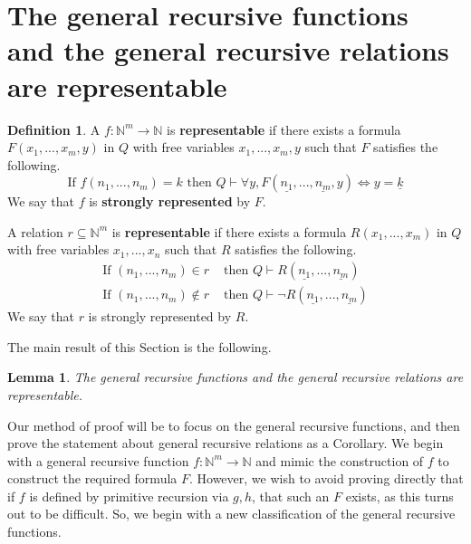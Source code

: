 \documentclass[12pt]{article}
\theoremstyle{plain}
\newtheorem{lemma}[thm]{Lemma}
\theoremstyle{definition}
\newtheorem{defn}[thm]{Definition} %
\newcommand{\bb}[1]{\mathbb{#1}}
\newcommand{\lto}{\longrightarrow}
\begin{document}
	\section{The general recursive functions and the general recursive relations are representable}
	\begin{defn}
		A $f:\bb{N}^m \lto \bb{N}$ is \textbf{representable} if there exists a formula $F(x_1,...,x_m,y)$ in $Q$ with free variables $x_1,...,x_m,y$ such that $F$ satisfies the following.
		\begin{equation}
			\text{If }f(n_1,...,n_m) = k \text{ then }Q\vdash \forall y, F(\underline{n_1},...,\underline{n_m},y)\Longleftrightarrow y = \underline{k}
		\end{equation}
		We say that $f$ is \textbf{strongly represented} by $F$.
		
		A relation $r \subseteq \bb{N}^m$ is \textbf{representable} if there exists a formula $R(x_1,...,x_m)$ in $Q$ with free variables $x_1,...,x_n$ such that $R$ satisfies the following.
		\begin{align*}
			\text{If }(n_1,...,n_m) \in r &\text{ then }Q\vdash R(\underline{n_1},...,\underline{n_m})\\
			\text{If }(n_1,...,n_m) \not\in r &\text{ then }Q\vdash\neg R(\underline{n_1},...,\underline{n_m})
		\end{align*}
		We say that $r$ is strongly represented by $R$.
	\end{defn}
	The main result of this Section is the following.
	\begin{lemma}\label{lem:strongly_representable}
		The general recursive functions and the general recursive relations are representable.
	\end{lemma}
	Our method of proof will be to focus on the general recursive functions, and then prove the statement about general recursive relations as a Corollary. We begin with a general recursive function $f:\bb{N}^m \lto \bb{N}$ and mimic the construction of $f$ to construct the required formula $F$. However, we wish to avoid proving directly that if $f$ is defined by primitive recursion via $g,h$, that such an $F$ exists, as this turns out to be difficult. So, we begin with a new classification of the general recursive functions.
\end{document}
